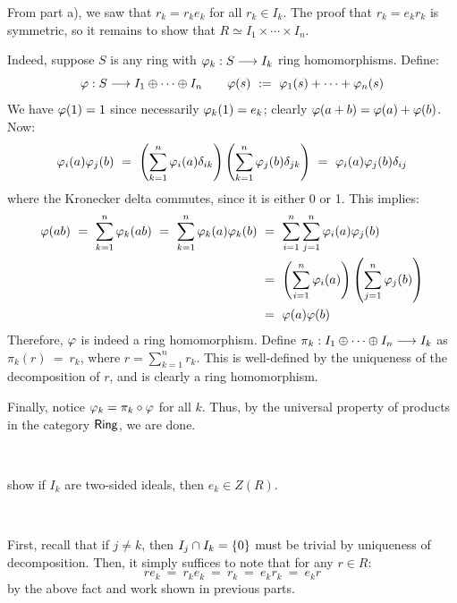 \begin{pf}
	From part a), we saw that $r_{k}=r_{k}e_{k}$ for all $r_{k}\in I_{k}$.
	The proof that $r_{k}=e_{k}r_{k}$ is symmetric, so it remains to show that
	$R\simeq I_{1}\times \cdots \times I_{n}$.

	Indeed, suppose $S$ is any ring with $\varphi_{k}:S\longrightarrow I_{k}$
	ring homomorphisms. Define:
	\begin{equation*}
	    \varphi:S\longrightarrow I_{1}\oplus\cdots\oplus I_{n} \qquad
		\varphi(s) \ := \ \varphi_{1}(s) + \dots + \varphi_{n}(s)
	\end{equation*}
	We have $\varphi(1)=1$ since necessarily $\varphi_{k}(1)=e_{k}$;
	clearly $\varphi(a+b)=\varphi(a)+\varphi(b)$. Now:
	\begin{equation*}
	    \varphi_{i}(a)\varphi_{j}(b) \ = \
		\left(\sum_{k=1}^{n}\varphi_{i}(a)\delta_{ik}\right)
		\left(\sum_{k=1}^{n}\varphi_{j}(b)\delta_{jk}\right)
		\ = \ \varphi_{i}(a)\varphi_{j}(b)\delta_{ij}
	\end{equation*}
	where the Kronecker delta commutes, since it is either 0 or 1.
	This implies:
	\begin{align*}
		\varphi(ab) \ = \ \sum_{k=1}^{n}\varphi_{k}(ab)
		\ = \ \sum_{k=1}^{n}\varphi_{k}(a)\varphi_{k}(b)
		& \ = \ \sum_{i=1}^{n}\sum_{j=1}^{n}\varphi_{i}(a)\varphi_{j}(b) \\
		& \ = \ \left(\sum_{i=1}^{n}\varphi_{i}(a)\right)
		\left(\sum_{j=1}^{n}\varphi_{j}(b)\right) \\
		& \ = \ \varphi(a)\varphi(b)
	\end{align*}
	Therefore, $\varphi$ is indeed a ring homomorphism.
	Define $\pi_{k}:I_{1}\oplus\cdots\oplus I_{n}\longrightarrow I_{k}$ as
	$\pi_{k}(r) \ = \ r_{k}$, where $r = \sum_{k=1}^{n}r_{k}$.
	This is well-defined by the uniqueness of the decomposition of $r$,
	and is clearly a ring homomorphism.

	Finally, notice $\varphi_{k}=\pi_{k}\circ\varphi$ for all $k$.
	Thus, by the universal property of products in the category $\mathsf{Ring}$,
	we are done.
\end{pf} \

\begin{exr}[title=Exercise 1.7 part c)]
    show if $I_{k}$ are two-sided ideals, then $e_{k}\in Z(R)$.
\end{exr} \

\begin{pf}
	First, recall that if $j\neq k$, then $I_{j}\cap I_{k}=\left\{{0}\right\}$ must be
	trivial by uniqueness of decomposition.
	Then, it simply suffices to note that for any $r\in R$:
	\begin{equation*}
	    re_{k} \ = \ r_{k}e_{k} \ = \ r_{k} \ = \ e_{k}r_{k} \ = \ e_{k}r
	\end{equation*}
	by the above fact and work shown in previous parts.
\end{pf} \


